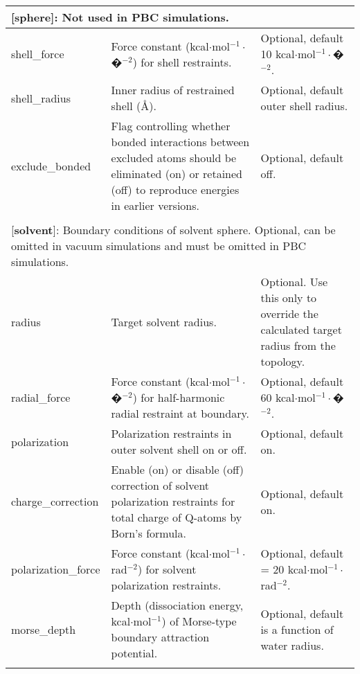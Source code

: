 \documentclass[a4paper,10pt]{article}
\begin{document}
\begin{longtable}{|p{78pt}|p{158pt}|p{158pt}|}
\multicolumn{3}{p{394pt}}{[\textbf{sphere}]: Not used in PBC simulations.}\\
\hline shell\_force & Force constant (kcal$\cdot$mol$^{-1}\cdot$�$^{-2}$) for shell restraints. & Optional, default 10 kcal$\cdot$mol$^{-1}\cdot$�$^{-2}$.\\
\hline shell\_radius & Inner radius of restrained shell (\AA). & Optional, default outer shell radius.\\
\hline exclude\_bonded & Flag controlling whether bonded interactions between excluded atoms should be eliminated (on) or retained (off) to reproduce energies in earlier versions. & Optional, default off.\\
\hline
\multicolumn{3}{p{394pt}}{}\\

\multicolumn{3}{p{394pt}}{[\textbf{solvent}]: Boundary conditions of solvent sphere. Optional, can be omitted in vacuum simulations and must be omitted in PBC simulations.}\\
\hline radius & Target solvent radius. &  Optional. Use this only to override the calculated target radius from the topology.\\
\hline radial\_force & Force constant (kcal$\cdot$mol$^{-1}\cdot$�$^{-2}$) for half-harmonic radial restraint at boundary. & Optional, default 60 kcal$\cdot$mol$^{-1}\cdot$�$^{-2}$.\\
\hline polarization & Polarization restraints in outer solvent shell on or off. & Optional, default on.\\
\hline charge\_correction &  Enable (on) or disable (off) correction of solvent polarization restraints for total charge of Q-atoms by Born's formula. & Optional, default on.\\
\hline polarization\_force & Force constant (kcal$\cdot$mol$^{-1}\cdot$rad$^{-2}$) for solvent polarization restraints. & Optional, default = 20 kcal$\cdot$mol$^{-1}\cdot$rad$^{-2}$.\\
\hline morse\_depth & Depth (dissociation energy, kcal$\cdot$mol$^{-1}$) of Morse-type boundary attraction potential. & Optional, default is a function of water radius.\\
\hline
\multicolumn{3}{p{394pt}}{}\\


\end{longtable}
\end{document}
